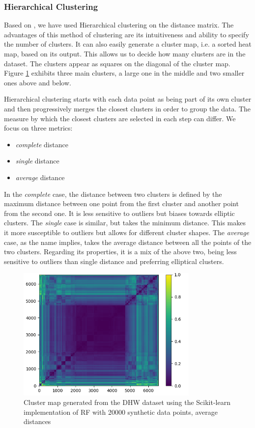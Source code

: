 \documentclass[conference]{IEEEtran}
\begin{document}
\subsubsection{Hierarchical Clustering}
Based on \cite{Kruber2019UnsupervisedAS}, we have used Hierarchical clustering on the distance matrix. The advantages of this method of clustering are its intuitiveness and ability to specify the number of clusters. It can also easily generate a cluster map, i.e. a sorted heat map, based on its output. This allows us to decide how many clusters are in the dataset. The clusters appear as squares on the diagonal of the cluster map. Figure \ref{map-scikit} exhibits three main clusters, a large one in the middle and two smaller ones above and below.

Hierarchical clustering starts with each data point as being part of its own cluster and then progressively merges the closest clusters in order to group the data. The measure by which the closest clusters are selected in each step can differ. We focus on three metrics:
\begin{itemize}
\item \emph{complete} distance
\item \emph{single} distance
\item \emph{average} distance
\end{itemize}
In the \emph{complete} case, the distance between two clusters is defined by the maximum distance between one point from the first cluster and another point from the second one. It is less sensitive to outliers but biases towards elliptic clusters. The \emph{single} case is similar, but takes the minimum distance. This makes it more susceptible to outliers but allows for different cluster shapes. The \emph{average} case, as the name implies, takes the average distance between all the points of the two clusters. Regarding its properties, it is a mix of the above two, being less sensitive to outliers than single distance and preferring elliptical clusters.

\begin{figure}[!h]
  \centering
  \includegraphics[width=3.5in]{./images/heatmap2}
  \caption{Cluster map generated from the DHW dataset using the Scikit-learn implementation of RF with 20000 synthetic data points, average distances}
  \label{map-scikit}
\end{figure}
\end{document}
